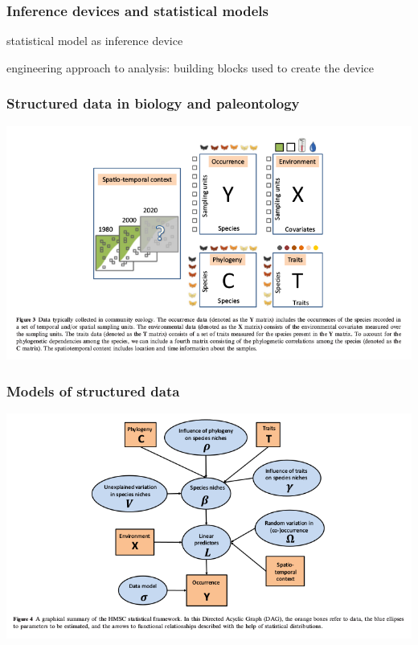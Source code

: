 \documentclass{beamer}
\begin{document}
\begin{frame}
  \frametitle{Inference devices and statistical models}

  statistical model as inference device

  engineering approach to analysis: building blocks used to create the device
\end{frame}

\begin{frame}
  \frametitle{Structured data in biology and paleontology}

  \includegraphics[width = \textwidth,height = 0.8\textheight,keepaspectratio = true]{figure/ovaskainen_data}

  \footnotesize{}
\end{frame}

\begin{frame}
  \frametitle{Models of structured data}

  \includegraphics[width = \textwidth,height = 0.8\textheight,keepaspectratio = true]{figure/ovaskainen_dag}

  \footnotesize{}
\end{frame}
\end{document}
